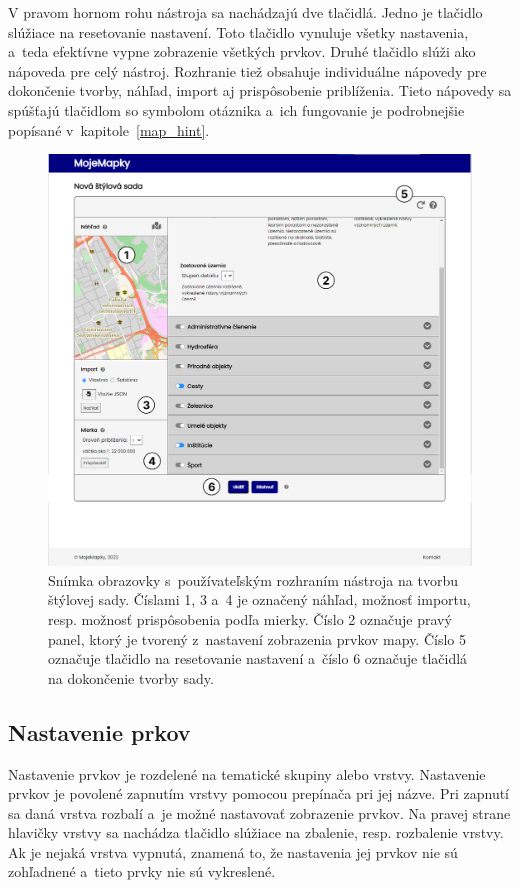 V pravom hornom rohu nástroja sa nachádzajú dve tlačidlá. Jedno je tlačidlo slúžiace na resetovanie nastavení. Toto tlačidlo vynuluje všetky nastavenia, a~teda efektívne vypne zobrazenie všetkých prvkov. Druhé tlačidlo slúži ako nápoveda pre celý nástroj. Rozhranie tiež obsahuje individuálne nápovedy pre dokončenie tvorby, náhľad, import aj prispôsobenie priblíženia. Tieto nápovedy sa spúšťajú tlačidlom so symbolom otáznika a~ich fungovanie je podrobnejšie popísané v~kapitole~\ref{map_hint}.

\begin{figure}[hbt]
	\centering
	\includegraphics[width=1\textwidth]{obrazky-figures/img_style.png}
	\caption{Snímka obrazovky s~používateľským rozhraním nástroja na tvorbu štýlovej sady. Číslami 1, 3 a~4 je označený náhľad, možnosť importu, resp. možnosť prispôsobenia podľa mierky. Číslo 2 označuje pravý panel, ktorý je tvorený z~nastavení zobrazenia prvkov mapy. Číslo 5 označuje tlačidlo na resetovanie nastavení a~číslo 6 označuje tlačidlá na dokončenie tvorby sady.}
	\label{img_create_style}
\end{figure}

\subsection*{Nastavenie prkov}
Nastavenie prvkov je rozdelené na tematické skupiny alebo vrstvy. Nastavenie prvkov je povolené zapnutím vrstvy pomocou prepínača pri jej názve. Pri zapnutí sa daná vrstva rozbalí a~je možné nastavovať zobrazenie prvkov. Na pravej strane hlavičky vrstvy sa nachádza tlačidlo slúžiace na zbalenie, resp. rozbalenie vrstvy. Ak je nejaká vrstva vypnutá, znamená to, že nastavenia jej prvkov nie sú zohľadnené a~tieto prvky nie sú vykreslené.

